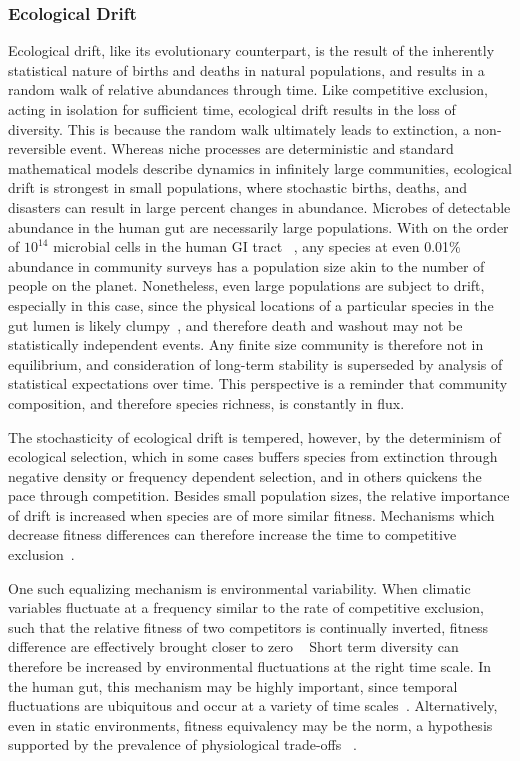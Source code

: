 \documentclass[12pt]{article}
\begin{document}
\subsubsection{Ecological Drift}
Ecological drift, like its evolutionary counterpart, is the result
of the inherently statistical nature of births and deaths in
natural populations, and results in a random walk of
relative abundances through time.
Like competitive exclusion, acting in isolation for
sufficient time,
ecological drift results in the loss of diversity.
This is because the random walk ultimately
leads to extinction, a non-reversible event.
Whereas niche processes are deterministic and standard mathematical
models describe dynamics in infinitely large communities,
ecological drift is strongest in small populations, where
stochastic births, deaths, and disasters can result in large
percent changes in abundance.
Microbes of detectable abundance in the human gut are necessarily
large populations.
With on the order of \(10^{14}\) microbial cells in the human GI tract%
~\citep{Whitman1998},
any species at even 0.01\% abundance in community surveys
has a population size akin to the number of people on the planet.
Nonetheless, even large populations are subject to drift,
especially in this case,
since the physical locations of a particular species in the gut lumen is likely
clumpy~\citep{Green2007},
and therefore death and washout may not be statistically independent events.
Any finite size community is therefore not in equilibrium,
and consideration of long-term stability is superseded by
analysis of statistical expectations over time.
This perspective is a reminder that community composition,
and therefore species richness, is constantly in flux.

The stochasticity of ecological drift is tempered, however,
by the determinism of ecological selection,
which in some cases buffers species from extinction through
negative density or frequency dependent selection,
and in others quickens the pace through competition.
Besides small population sizes, the relative importance of
drift is increased when species are of more similar fitness.
Mechanisms which decrease fitness differences can therefore
increase the time to competitive exclusion~\citep{Chesson2000,Adler2007}.

One such equalizing mechanism is environmental variability.
When climatic variables fluctuate at a frequency similar to the
rate of competitive exclusion, such that the relative fitness of
two competitors is continually inverted,
fitness difference are effectively brought closer to zero%
~\citep{Hutchinson1961,Chesson1981}
Short term diversity can therefore be increased by
environmental fluctuations at the right time scale.
In the human gut, this mechanism may be highly important,
since temporal fluctuations are ubiquitous and occur at a variety of time
scales~\citep{Thaiss2014}.
Alternatively, even in static environments,
fitness equivalency may be the norm,
a hypothesis supported by the prevalence of physiological trade-offs%
~\citep{Adler2007}.
\end{document}

